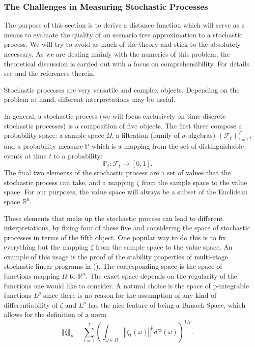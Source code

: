\documentclass[a4paper, 12pt] {article}
\begin{document}
\subsubsection{The Challenges in Measuring Stochastic Processes}
The purpose of this section is to derive a distance function which will serve as a means to evaluate the quality of an scenario tree approximation to a stochastic process. We will try to avoid as much of the theory and stick to the absolutely necessary. As we are dealing mainly with the numerics of this problem, the theoretical discussion is carried out with a focus on comprehensibility. For details see \cite{Heitsch2010} and the references therein.

Stochastic processes are very versatile and complex objects. Depending on the problem at hand, different interpretations may be useful. 

In general, a stochastic process (we will focus exclusively on time-discrete stochastic processes) is a composition of five objects. The first three compose a probability space: a sample space $\Omega$, a filtration (family of $\sigma$-algebras) $\left\{\mathcal{F}_t\right\}_{t=1}^T$, and a probability measure $\mathbb{P}$ which is a mapping from the set of distinguishable events at time $t$ to a probability:
\begin{equation}
  \label{eq:prob-measure-definition}
  \mathbb{P}_t : \mathcal{F}_t \rightarrow \left[0,1\right].
\end{equation}
The final two elements of the stochastic process are a set of values that the stochastic process can take, and a mapping $\zeta$ from the sample space to the value space. For our purposes, the value space will always be a subset of the Euclidean space $\mathbb{R}^n$.

These elements that make up the stochastic process can lead to different interpretations, by fixing four of these five and considering the space of stochastic processes in terms of the fifth object. One popular way to do this is to fix everything but the mapping $\zeta$ from the sample space to the value space. An example of this usage is the proof of the stability properties of multi-stage stochastic linear programs in (\cite{Heitsch2010}). The corresponding space is the space of functions mapping $\Omega$ to $\mathbb{R}^n$. The exact space depends on the regularity of the functions one would like to consider. A natural choice is the space of p-integrable functions $L^p$ since there is no reason for the assumption of any kind of differentiability of $\zeta$ and $L^p$ has the nice feature of being a Banach Space, which allows for the definition of a norm
\begin{equation}
  \label{eq:Lp-norm}
  \left\Vert\xi\right\Vert_p = \sum_{t=1}^T\left(\int_{\omega\in \Omega}\left\Vert\zeta_t(\omega)\right\Vert^p d\mathbb{P}(\omega)\right)^{1/p}.
\end{equation}
\end{document}
